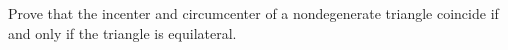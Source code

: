 Prove that the incenter and circumcenter of a nondegenerate triangle coincide if and only if the triangle is equilateral.

